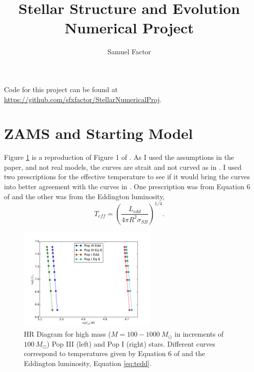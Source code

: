 \documentclass[12pt]{paper}
\title{Stellar Structure and Evolution Numerical Project}
\author{Samuel Factor}
\begin{document}
\maketitle

Code for this project can be found at \\
\url{https://github.com/sfxfactor/StellarNumericalProj}.

\section{ZAMS and Starting Model}
Figure \ref{fig:fig1} is a reproduction of Figure 1 of \citet{BKL}. As I used the assumptions in the paper, and not real models, the curves are strait and not curved as in \citet{BKL}. I used two prescriptions for the effective temperature to see if it would bring the curves into better agreement with the curves in \citet{BKL}. One prescription was from Equation 6 of \citet{BKL} and the other was from the Eddington luminosity,
\begin{equation}\label{eq:tedd}
T_{eff}=\left(\frac{L_{edd}}{4\pi R^2 \sigma_{SB}}\right)^{1/4}.
\end{equation}


\begin{figure}
\begin{center}
    \includegraphics[width=0.6\textwidth]{fig1.pdf}
    \caption{HR Diagram for high mass ($M=100-1000~M_\odot$ in increments of $100~M_\odot$) Pop III (left) and Pop I (right) stars. Different curves correspond to temperatures given by Equation 6 of \citet{BKL} and the Eddington luminosity, Equation \ref{eq:tedd}. }
    \label{fig:fig1}
\end{center}
\end{figure}
\end{document}
